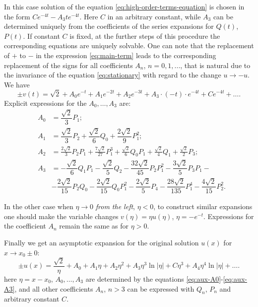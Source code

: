 In this case solution of the equation \eqref{eq:high-order-terms-equation} is chosen in the form $Ce^{-4t} - A_3 t e^{-4t}$.
Here $C$ in an arbitrary constant, while $A_3$ can be determined uniquely from the coefficients of the series expansions for $Q(t)$, $P(t)$.
If constant $C$ is fixed, at the further steps of this procedure the corresponding equations are uniquely solvable.
One can note that the replacement of $+$ to $-$ in the expression \eqref{eq:main-term} leads to the corresponding replacement of the signs for all coefficients $A_n$, $n = 0, 1,...$, that is natural due to the invariance of the equation \eqref{eq:stationary} with regard to the change $u \to -u$.
We have
\begin{equation}
	\pm v(t) = \sqrt{2} + A_0 e^{-t} + A_1 e^{-2t} + A_2 e^{-3t} + A_3 \cdot (-t) \cdot e^{-4t} + C e^{-4t} + \dots.
	\label{eq:expansion-intermediate}
\end{equation}
Explicit expressions for the $A_0, \dots, A_3$ are:
\begin{eqnarray}
	& A_0 & = \dfrac{\sqrt{2}}{3} P_1; \label{eq:aux-A0} \\
	& A_1 & = \dfrac{\sqrt{2}}{3} P_2 + \dfrac{\sqrt{2}}{6} Q_0 + \dfrac{2 \sqrt{2}}{9} P_1^2; \label{eq:aux-A1} \\
	& A_2 & = \frac{2\sqrt{2}} 3P_2 P_1 + \frac{7\sqrt{2}}{27} P_1^3 + \frac{\sqrt{2}} 6Q_0 P_1 + \frac{\sqrt{2}} 4Q_1 + \frac{\sqrt{2}} 2P_3; \label{eq:aux-A2} \\
	& A_3 & = -\dfrac{\sqrt{2}}{6} Q_1 P_1 - \dfrac{\sqrt{2}}{5} Q_2 - \dfrac{32 \sqrt{2}}{45} P_2 P_1^2 - \dfrac{3 \sqrt{2}}{5} P_3 P_1 - \\
	&& - \dfrac{2 \sqrt{2}}{15} P_2 Q_0 -\dfrac{2 \sqrt{2}}{15} Q_0 P_1^2 - \dfrac{2 \sqrt{2}}{5} P_4 - \dfrac{28 \sqrt{2}}{135} P_1^4 - \dfrac{4 \sqrt{2}}{15} P_2^2. \label{eq:aux-A3}
\end{eqnarray}

In the other case when $\eta \to 0$ {\it from the left}, $\eta < 0$, to construct similar expansions one should make the variable changes $v(\eta) = \eta u(\eta)$, $\eta = -e^{-t}$.
Expressions for the coefficient $A_n$ remain the same as for $\eta > 0$.

Finally we get an asymptotic expansion for the original solution $u(x)$ for $x \to x_0 \pm 0$:
\begin{equation}
	\pm u(x) = \dfrac{\sqrt{2}}{\eta} + A_0 + A_1 \eta + A_2 \eta^2 + A_3 \eta^3 \ln |\eta| + C \eta^3+ A_4 \eta^4 \ln |\eta| + \dots.
	\label{eq:expansion}
\end{equation}
here $\eta = x - x_0$, $A_0, \dots, A_3$ are determined by the equations \eqref{eq:aux-A0}-\eqref{eq:aux-A3}, and all other coefficients $A_n$, $n > 3$ can be expressed with $Q_n$, $P_n$ and arbitrary constant $C$.

